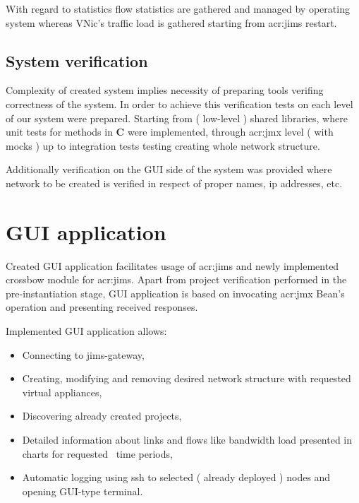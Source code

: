 \documentclass[11pt]{book}
\begin{document}
			With regard to statistics flow statistics are gathered and managed by operating system whereas 
			VNic's traffic load is gathered starting from \gls{acr:jims} restart.
		
		\subsection{System verification}
			\label{sec:impl:verif}
		
			Complexity of created system implies necessity of preparing tools verifing correctness of the system. In order to achieve 
			this verification tests on each level of our system were prepared. Starting from ( low-level ) shared libraries, where unit tests
			for methods in \textbf{C} were implemented, through \gls{acr:jmx} level ( with mocks ) up to integration tests testing creating whole 
			network structure.
		
			Additionally verification on the GUI side of the system was provided where network to be created is verified in respect of 
			proper names, ip addresses, etc.

	\section{GUI application}
		\label{sec:impl:gui}
		
		Created GUI application facilitates usage of \gls{acr:jims} and newly implemented crossbow module for \gls{acr:jims}. Apart from project verification 
                performed in the pre-instantiation stage, GUI application is based on invocating \gls{acr:jmx} Bean's operation and presenting received responses.

		Implemented GUI application allows:
		\begin{itemize}
			\item{Connecting to jims-gateway,}
			\item{Creating, modifying and removing desired network structure with requested virtual appliances,}
			\item{Discovering already created projects,}
			\item{Detailed information about links and flows like bandwidth load presented in charts for requested \
				time periods,}
			\item{Automatic logging using ssh to selected ( already deployed ) nodes and opening GUI-type terminal.}
		\end{itemize}		
\end{document}
